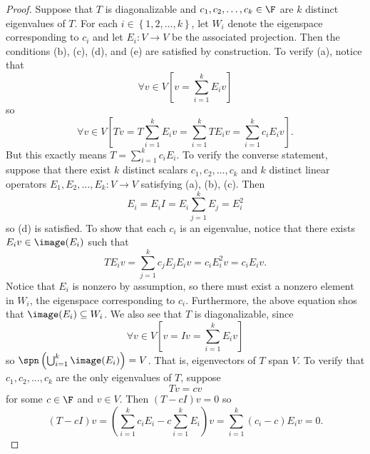 \documentclass[linearalgebra]{subfiles}
\begin{document}
    \begin{proof}
        Suppose that $T$ is diagonalizable and $c_1, c_2, \ldots, c_k\in \F$ are $k$ distinct eigenvalues of $T$. For each $i\in \left\lbrace 1, 2, \ldots, k \right\rbrace$, let $W_i$ denote the eigenspace corresponding to $c_i$ and let $E_i:V\to V$ be the associated projection. Then the conditions (b), (c), (d), and (e) are satisfied by construction. To verify (a), notice that
        \begin{equation*}
            \forall v\in V \left[ v = \sum^{k}_{i=1} E_iv \right] 
        \end{equation*}
        so
        \begin{equation*}
            \forall v\in V \left[ Tv = T \sum^{k}_{i=1} E_iv = \sum^{k}_{i=1} TE_iv = \sum^{k}_{i=1} c_iE_iv \right].
        \end{equation*}
        But this exactly means $T = \sum^{k}_{i=1} c_iE_i$. To verify the converse statement, suppose that there exist $k$ distinct scalars $c_1, c_2, \ldots, c_k$ and $k$ distinct linear operators $E_1, E_2, \ldots, E_k:V\to V$ satisfying (a), (b), (c). Then
        \begin{equation*}
            E_i = E_iI = E_i \sum^{k}_{j=1} E_j = E_i^2
        \end{equation*} 
        so (d) is satisfied. To show that each $c_i$ is an eigenvalue, notice that there exists $E_iv\in \image(E_i)$ such that
        \begin{equation*}
            TE_iv = \sum^{k}_{j=1} c_jE_jE_iv = c_iE_i^2v = c_iE_iv.
        \end{equation*}
        Notice that $E_i$ is nonzero by assumption, so there must exist a nonzero element in $W_i$, the eigenspace corresponding to $c_i$. Furthermore, the above equation shos that $\image(E_i)\subseteq W_i$. We also see that $T$ is diagonalizable, since
        \begin{equation*}
            \forall v\in V \left[ v = Iv = \sum^{k}_{i=1} E_iv \right] 
        \end{equation*}
        so $\spn \left( \bigcup^{k}_{i=1} \image(E_i) \right) = V$. That is, eigenvectors of $T$ span $V$. To verify that $c_1, c_2, \ldots, c_k$ are the only eigenvalues of $T$, suppose
        \begin{equation*}
            Tv = cv
        \end{equation*}
        for some $c\in \F$ and $v\in V$. Then $(T-cI)v = 0$ so
        \begin{equation*}
            (T-cI)v = \left( \sum^{k}_{i=1} c_iE_i - c \sum^{k}_{i=1} E_i \right) v = \sum^{k}_{i=1} (c_i-c) E_iv = 0.

\end{equation*}
\end{proof}
\end{document}
